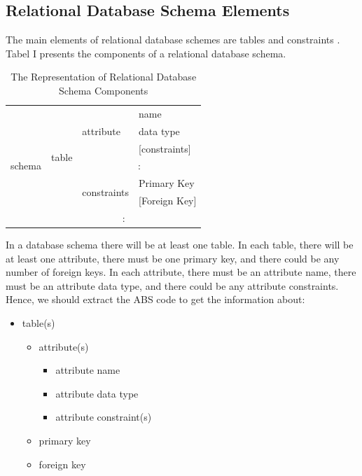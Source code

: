 \documentclass[conference]{IEEEtran}
\begin{document}
\subsection{Relational Database Schema Elements}
The main elements of relational database schemes are tables and constraints \cite{book2}. Tabel I presents the components of a relational database schema.

\begin{table}[]
	\centering
	\caption{The Representation of Relational Database Schema Components}
	\label{tabel1}
	\begin{tabular}{|l|l|l|l|}
		\hline
		\multirow{9}{*}{schema} & \multirow{7}{*}{table} & \multirow{3}{*}{attribute}   & name              \\ \cline{4-4} 
		&                        &                              & data type         \\ \cline{4-4} 
		&                        &                              & {[}constraints{]} \\ \cline{3-4} 
		&                        & \multicolumn{2}{c|}{\multirow{2}{*}{:}}          \\
		&                        & \multicolumn{2}{c|}{}                            \\ \cline{3-4} 
		&                        & \multirow{2}{*}{constraints} & Primary Key       \\ \cline{4-4} 
		&                        &                              & {[}Foreign Key{]} \\ \cline{2-4} 
		& \multicolumn{3}{c|}{\multirow{2}{*}{:}}                                   \\
		& \multicolumn{3}{c|}{}                                                     \\ \hline
	\end{tabular}
\end{table}

In a database schema there will be at least one table. In each table, there will be at least one attribute, there must be one primary key, and there could be any number of foreign keys. In each attribute, there must be an attribute name, there must be an attribute data type, and there could be any attribute constraints. Hence, we should extract the ABS code to get the information about:
\begin{itemize}
	\item table(s)
	\begin{itemize}	
		\item attribute(s)
		\begin{itemize}
			\item attribute name
			\item attribute data type
			\item attribute constraint(s)
		\end{itemize}
		\item primary key
		\item foreign key
	\end{itemize}
\end{itemize}
\end{document}
